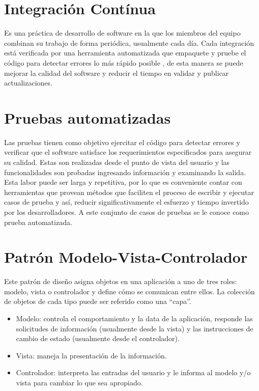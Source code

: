 \section{Integración Contínua}

Es una práctica de desarrollo de software en la que los miembros del equipo combinan su trabajo de forma periódica, usualmente cada día. Cada integración está verificada por una herramienta automatizada que empaquete y pruebe el código para detectar errores lo más rápido posible \cite{Integracion_Continua}, de esta manera se puede mejorar la calidad del software y reducir el tiempo en validar y publicar actualizaciones.

\section{Pruebas automatizadas}

Las pruebas tienen como objetivo ejercitar el código para detectar errores y verificar que el software satisface los requerimientos especificados para asegurar su calidad. Estas son realizadas desde el punto de vista del usuario y las funcionalidades son probadas ingresando información y examinando la salida. \cite{Pruebas_Automatizadas}\\ 

Esta labor puede ser larga y repetitiva, por lo que es conveniente contar con herramientas que provean métodos que faciliten el proceso de escribir y  ejecutar casos de prueba y así, reducir significativamente el esfuerzo y tiempo invertido por los desarrolladores. \cite{Pruebas_Automatizadas} A este conjunto de casos de pruebas se le conoce como prueba automatizada.

\section{Patrón Modelo-Vista-Controlador}

Este patrón de diseño asigna objetos en una aplicación a uno de tres roles: modelo, vista o controlador y define cómo se comunican entre ellos. La colección de objetos de cada tipo puede ser referido como una “capa”.\cite{MVC}

\begin{itemize}
    \item Modelo: controla el comportamiento y la data de la aplicación, responde las solicitudes de información (usualmente desde la vista) y las instrucciones de cambio de estado (usualmente desde el controlador).
    \item Vista: maneja la presentación de la información.
    \item Controlador: interpreta las entradas del usuario y le informa al modelo y/o vista para cambiar lo que sea apropiado.\cite{MVC1}
\end{itemize}



